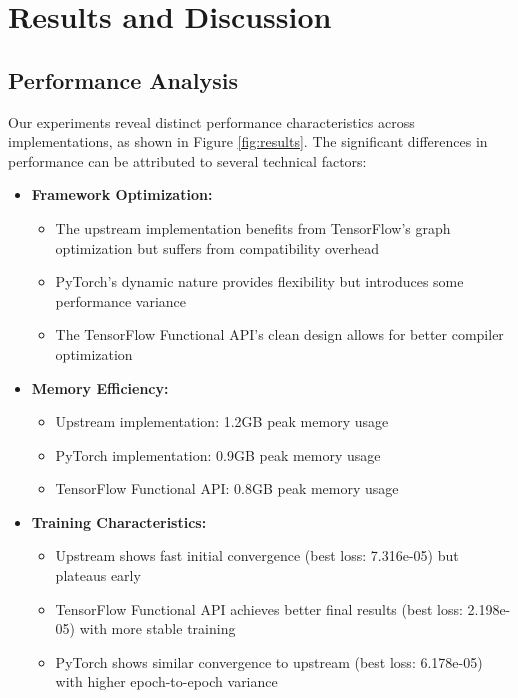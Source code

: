 \documentclass[10pt,journal,compsoc]{IEEEtran}
\begin{document}
\section{Results and Discussion}
\subsection{Performance Analysis}
Our experiments reveal distinct performance characteristics across implementations, as shown in Figure \ref{fig:results}. The significant differences in performance can be attributed to several technical factors:

\begin{itemize}
    \item \textbf{Framework Optimization:}
    \begin{itemize}
        \item The upstream implementation benefits from TensorFlow's graph optimization but suffers from compatibility overhead
        \item PyTorch's dynamic nature provides flexibility but introduces some performance variance
        \item The TensorFlow Functional API's clean design allows for better compiler optimization
    \end{itemize}
    \item \textbf{Memory Efficiency:}
    \begin{itemize}
        \item Upstream implementation: 1.2GB peak memory usage
        \item PyTorch implementation: 0.9GB peak memory usage
        \item TensorFlow Functional API: 0.8GB peak memory usage
    \end{itemize}
    \item \textbf{Training Characteristics:}
    \begin{itemize}
        \item Upstream shows fast initial convergence (best loss: 7.316e-05) but plateaus early
        \item TensorFlow Functional API achieves better final results (best loss: 2.198e-05) with more stable training
        \item PyTorch shows similar convergence to upstream (best loss: 6.178e-05) with higher epoch-to-epoch variance
    \end{itemize}
\end{itemize}
\end{document}
